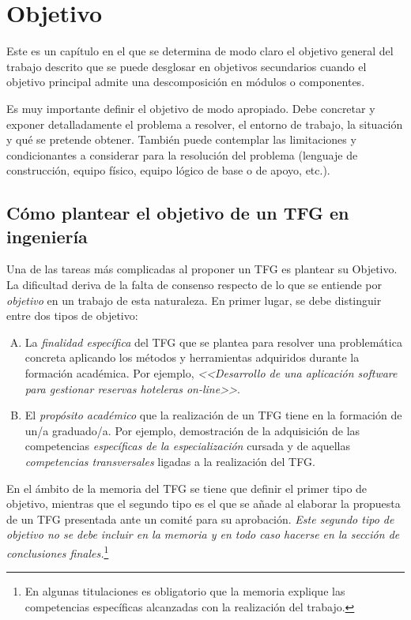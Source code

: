 \chapter{Objetivo}
\label{cap:Objetivo}
Este es un capítulo en el que se determina de modo claro el objetivo general del trabajo descrito que se puede desglosar en objetivos secundarios cuando el objetivo principal admite una descomposición en módulos o componentes. 

Es muy importante definir el objetivo de modo apropiado. Debe concretar y exponer detalladamente el problema a resolver, el entorno de trabajo, la situación y qué se pretende obtener. También puede contemplar las limitaciones y condicionantes a considerar para la resolución del problema (lenguaje de construcción, equipo físico, equipo lógico de base o de apoyo, 
etc.).


\section{Cómo plantear el objetivo de un TFG en ingeniería}
Una de las tareas más complicadas al proponer un TFG es plantear su \textsf{Objetivo}. La dificultad deriva de la falta de consenso respecto de lo que se entiende por \emph{objetivo} en un trabajo de esta naturaleza. En primer lugar, se debe distinguir entre dos tipos de objetivo:


\begin{enumerate}[(A)]
	\item La \emph{finalidad específica} del TFG que se plantea para resolver una problemática concreta aplicando los métodos y herramientas adquiridos durante la formación académica. Por ejemplo, \emph{<<Desarrollo de una aplicación software para gestionar reservas hoteleras \emph{on-line}>>}.
	
	\item El \emph{propósito académico} que la realización de un TFG tiene en la formación de un/a graduado/a. Por ejemplo, demostración de la adquisición de las competencias \emph{específicas de la especialización} cursada y de aquellas \emph{competencias transversales} ligadas a la realización del TFG.
\end{enumerate}

En el ámbito de la memoria del TFG se tiene que definir el primer tipo de objetivo, mientras que el segundo tipo es el que se añade al elaborar la propuesta de un TFG presentada ante un comité para su aprobación. \emph{Este segundo tipo de objetivo no se debe incluir en la memoria y en todo caso hacerse en la sección de conclusiones finales.}\footnote{En algunas titulaciones es obligatorio que la memoria explique las competencias específicas alcanzadas con la realización del trabajo.}

